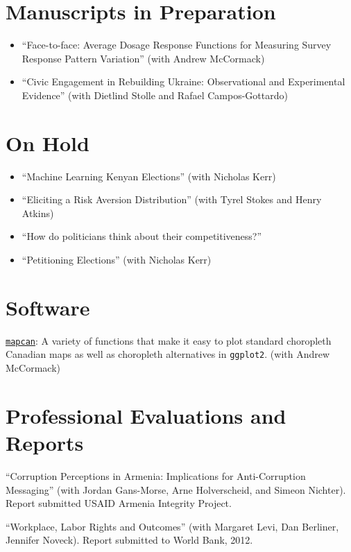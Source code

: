 \documentclass[margin,line]{res}
\begin{document}
\section{\sc Manuscripts in Preparation}

\begin{itemize}[label={--}]

\item ``Face-to-face: Average Dosage Response Functions for Measuring Survey Response Pattern Variation'' (with Andrew McCormack)

\item ``Civic Engagement in Rebuilding Ukraine: Observational and Experimental Evidence'' (with Dietlind Stolle and Rafael Campos-Gottardo)
\end{itemize}

\section{\sc On Hold}

\begin{itemize}[label={--}]
\item ``Machine Learning Kenyan Elections'' (with Nicholas Kerr)
\item  ``Eliciting a Risk Aversion Distribution'' (with Tyrel Stokes and Henry Atkins)
\item ``How do politicians think about their competitiveness?''
\item ``Petitioning Elections'' (with Nicholas Kerr)
\end{itemize}


\section{\sc Software}
\href{https://CRAN.R-project.org/package=mapcan}{\texttt{mapcan}}: A variety of functions that make it easy to plot standard choropleth Canadian maps as well as choropleth alternatives in \texttt{ggplot2}. (with Andrew McCormack)


\section{\sc Professional Evaluations and Reports}
``Corruption Perceptions in Armenia: Implications for Anti-Corruption Messaging'' (with Jordan Gans-Morse, Arne Holverscheid, and Simeon Nichter). Report submitted USAID Armenia Integrity Project.

``Workplace, Labor Rights and Outcomes'' (with Margaret Levi, Dan Berliner, Jennifer Noveck). Report submitted to World Bank,  2012.
\end{document}
